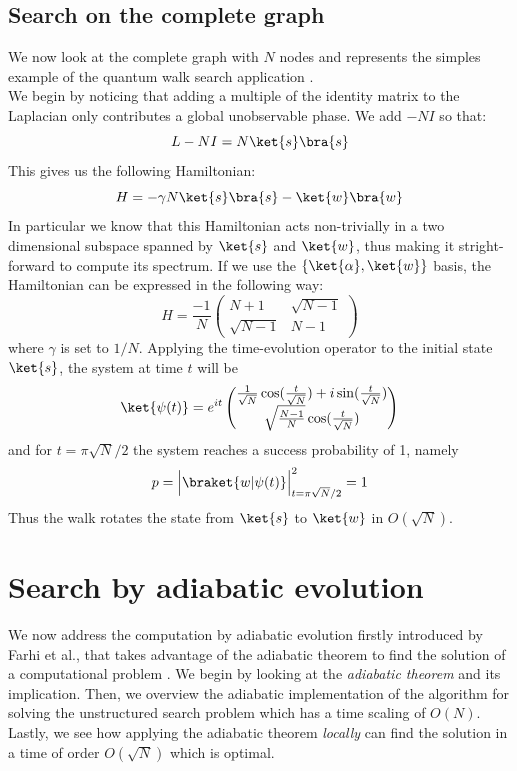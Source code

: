 \subsection{Search on the complete graph}\label{subsec:search qw complete graph}
We now look at the complete graph with $N$ nodes and represents the simples example of the quantum walk search application \cite{Childs2004}. \\We begin by noticing that adding a multiple of the identity matrix to the Laplacian only contributes a global unobservable phase. We add $-NI$ so that:
\begin{equation}
  L - NI = N\ket{s}\bra{s}
\end{equation}
This gives us the following Hamiltonian:
\begin{equation}
  H = -\gamma N\ket{s}\bra{s} - \ket{w}\bra{w}
\end{equation}
In particular we know that this Hamiltonian acts non-trivially in a two dimensional subspace spanned by $\ket{s}$ and $\ket{w}$, thus making it stright-forward to compute its spectrum. If we use the $\{\ket{\alpha}, \ket{w}\}$ basis, the Hamiltonian can be expressed in the following way:
\begin{equation}
  H = \frac{-1}{N} \begin{pmatrix} N+1 & \sqrt{N-1}\\ \sqrt{N-1} & N-1 \end{pmatrix}
\end{equation}
where $\gamma$ is set to $1/N$.
Applying the time-evolution operator to the initial state $\ket{s}$, the system at time $t$ will be
\begin{equation}
  \ket{\psi(t)} = e^{it}
  \begin{pmatrix}
  \frac{1}{\sqrt{N}}\cos(\frac{t}{\sqrt{N}}) +i\sin(\frac{t}{\sqrt{N}})\\
  \sqrt{\frac{N-1}{N}}\cos(\frac{t}{\sqrt{N}})
  \end{pmatrix}
  \label{eq:qw_state_ref}
\end{equation}
and for $t=\pi\sqrt{N}/2$ the system reaches a success probability of 1, namely
\begin{equation}
  p = \Big|\braket{w|\psi(t)}\Big|^2_{t=\pi\sqrt{N}/2} = 1
\end{equation}
Thus the walk rotates the state from $\ket{s}$ to $\ket{w}$ in $O(\sqrt{N})$.

\section{Search by adiabatic evolution}\label{sec:adiabatic evolution}
We now address the computation by adiabatic evolution firstly introduced by Farhi et al., that takes advantage of the adiabatic theorem to find the solution of a computational problem \cite{Farhi2000}. We begin by looking at the \textit{adiabatic theorem} and its implication. Then, we overview the adiabatic implementation of the algorithm for solving the unstructured search problem which has a time scaling of $O(N)$. Lastly, we see how applying the adiabatic theorem \textit{locally} can find the solution in a time of order $O(\sqrt{N})$ which is optimal.

